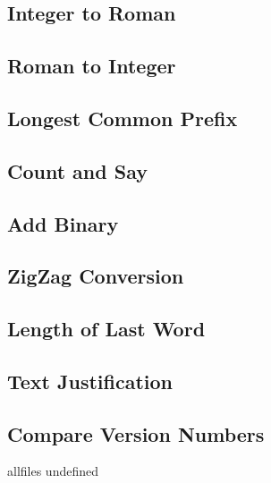 \documentclass{article}
\begin{document}
\begin{CJK}{UTF8}{gbsn}     %

\else

\subsection{Integer to Roman}

\subsection{Roman to Integer}

\subsection{Longest Common Prefix}

\subsection{Count and Say}

\subsection{Add Binary}

\subsection{ZigZag Conversion}

\subsection{Length of Last Word}

\subsection{Text Justification}

\subsection{Compare Version Numbers}


\fi

\ifx allfiles undefined
\end{CJK}
\end{document}
